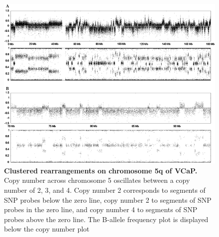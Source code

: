 \begin{figure}
    \includegraphics[width=\textwidth]{chapters/images/vcap/gnuplots.png}
    \caption{\textbf{Clustered rearrangements on chromosome 5q of VCaP.} Copy number across chromosome 5 oscillates between a copy number of 2, 3, and 4.
Copy number 2 corresponds to segments of SNP probes below the zero line, copy number 2 to segments of SNP probes in the zero line, and copy number
4 to segments of SNP probes above the zero line. The B-allele frequency plot is displayed below the copy number plot}
    \label{fig:vcap-gnuplot}
\end{figure}

